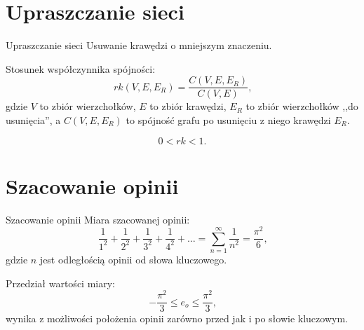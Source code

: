 \documentclass{beamer}
\begin{document}
\section{Upraszczanie sieci}
\begin{frame}{Upraszczanie sieci}
  Usuwanie krawędzi o mniejszym znaczeniu.
  
  Stosunek współczynnika spójności:
  \begin{equation}
    rk(V, E, E_R) = \frac{C(V, E, E_R)}{C(V, E)} \mbox{,}
  \end{equation}
  gdzie $V$ to zbiór wierzchołków, $E$ to zbiór krawędzi, $E_R$ to zbiór wierzchołków ,,do usunięcia'', a $C(V, E, E_R)$ to spójność grafu po usunięciu z niego krawędzi $E_R$.
  
  \begin{equation}
    0 < rk < 1 \mbox{.}
  \end{equation}

\end{frame}

\section{Szacowanie opinii}
\begin{frame}{Szacowanie opinii}
  Miara szacowanej opinii:
  \begin{equation}
    \frac{1}{1^2} + \frac{1}{2^2} + \frac{1}{3^2} + \frac{1}{4^2} + \ldots = \sum_{n=1}^\infty \frac{1}{n^2} = \frac{\pi^2}{6} \mbox{,}
  \end{equation}
  gdzie $n$ jest odległością opinii od słowa kluczowego.

  Przedział wartości miary:
  \begin{equation}
    -\frac{\pi^2}{3} \leq e_o \leq \frac{\pi^2}{3} \mbox{,}
  \end{equation}
  wynika z możliwości położenia opinii zarówno przed jak i po słowie kluczowym.

\end{frame}
\end{document}

